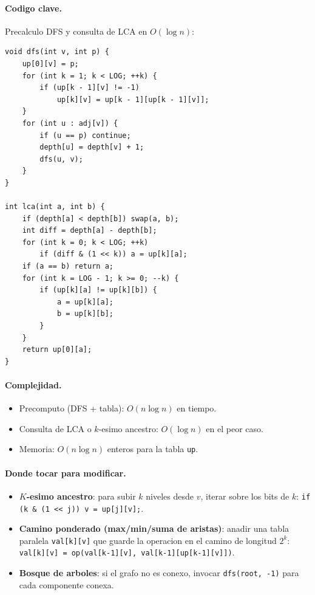 \paragraph{Codigo clave.}
Precalculo DFS y consulta de LCA en $O(\log n)$:
\begin{verbatim}
void dfs(int v, int p) {
    up[0][v] = p;
    for (int k = 1; k < LOG; ++k) {
        if (up[k - 1][v] != -1)
            up[k][v] = up[k - 1][up[k - 1][v]];
    }
    for (int u : adj[v]) {
        if (u == p) continue;
        depth[u] = depth[v] + 1;
        dfs(u, v);
    }
}

int lca(int a, int b) {
    if (depth[a] < depth[b]) swap(a, b);
    int diff = depth[a] - depth[b];
    for (int k = 0; k < LOG; ++k)
        if (diff & (1 << k)) a = up[k][a];
    if (a == b) return a;
    for (int k = LOG - 1; k >= 0; --k) {
        if (up[k][a] != up[k][b]) {
            a = up[k][a];
            b = up[k][b];
        }
    }
    return up[0][a];
}
\end{verbatim}

\paragraph{Complejidad.}
\begin{itemize}\setlength\itemsep{0pt}
	\item Precomputo (DFS + tabla): $O(n \log n)$ en tiempo.
	\item Consulta de LCA o $k$-esimo ancestro: $O(\log n)$ en el peor caso.
	\item Memoria: $O(n \log n)$ enteros para la tabla \texttt{up}.
\end{itemize}

\paragraph{Donde tocar para modificar.}
\begin{itemize}\setlength\itemsep{0pt}
	\item \textbf{$K$-esimo ancestro}: para subir $k$ niveles desde $v$, iterar sobre los bits de $k$: \verb|if (k & (1 << j)) v = up[j][v];|.
	\item \textbf{Camino ponderado (max/min/suma de aristas)}: anadir una tabla paralela \texttt{val[k][v]} que guarde la operacion en el camino de longitud $2^k$: \verb|val[k][v] = op(val[k-1][v], val[k-1][up[k-1][v]])|.
	\item \textbf{Bosque de arboles}: si el grafo no es conexo, invocar \texttt{dfs(root, -1)} para cada componente conexa.
\end{itemize}

